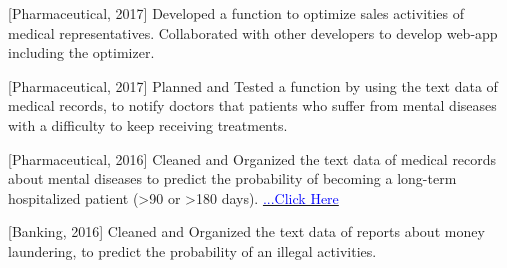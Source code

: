 \begin{cventries}
{\begin{cvenumerate}
        \item {[Pharmaceutical, 2017] Developed a function to optimize sales activities of medical representatives. Collaborated with other developers to develop web-app including the optimizer.}
        \item {[Pharmaceutical, 2017] Planned and Tested a function by using the text data of medical records, to notify doctors that patients who suffer from mental diseases with a difficulty to keep receiving treatments.}
        \item {[Pharmaceutical, 2016] Cleaned and Organized the text data of medical records about mental diseases to predict the probability of becoming a long-term hospitalized patient (>90 or >180 days). \href{https://www.ibm.com/downloads/cas/VVYMQYLZ}{\textcolor{blue}{...Click Here}}}
        \item {[Banking, 2016] Cleaned and Organized the text data of reports about money laundering, to predict the probability of an illegal activities.}
      \end{cvenumerate}
    }
\end{cventries}

